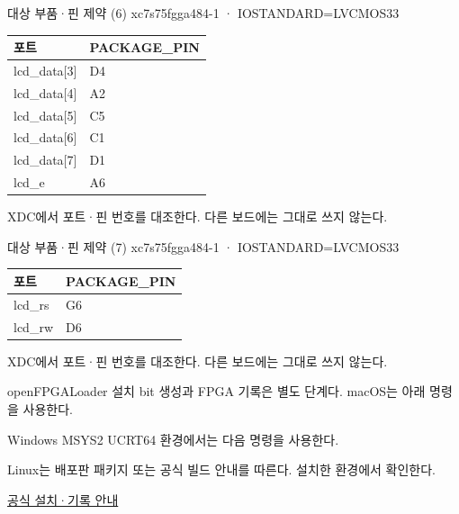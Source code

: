 \begin{frame}{대상 부품·핀 제약 (6)}\relax
\small
xc7s75fgga484-1 · IOSTANDARD=LVCMOS33\par\begin{center}\renewcommand{\arraystretch}{1.45}
\begin{tabular}{l|l}
포트 & PACKAGE\_PIN\\\hline
lcd\_data[3] & D4\\
lcd\_data[4] & A2\\
lcd\_data[5] & C5\\
lcd\_data[6] & C1\\
lcd\_data[7] & D1\\
lcd\_e & A6\\
\end{tabular}\end{center}
XDC에서 포트·핀 번호를 대조한다. 다른 보드에는 그대로 쓰지 않는다.\par
\end{frame}

\begin{frame}{대상 부품·핀 제약 (7)}\relax
\small
xc7s75fgga484-1 · IOSTANDARD=LVCMOS33\par\begin{center}\renewcommand{\arraystretch}{1.45}
\begin{tabular}{l|l}
포트 & PACKAGE\_PIN\\\hline
lcd\_rs & G6\\
lcd\_rw & D6\\
\end{tabular}\end{center}
XDC에서 포트·핀 번호를 대조한다. 다른 보드에는 그대로 쓰지 않는다.\par
\end{frame}

\begin{frame}[label=integrated-cli-post]{openFPGALoader 설치}\relax
\small
bit 생성과 FPGA 기록은 별도 단계다. macOS는 아래 명령을 사용한다.\par{}
Windows MSYS2 UCRT64 환경에서는 다음 명령을 사용한다.\par{}
Linux는 배포판 패키지 또는 공식 빌드 안내를 따른다. 설치한 환경에서 확인한다.\par{}
\href{https://trabucayre.github.io/openFPGALoader/guide/first-steps.html}{공식 설치·기록 안내}
\end{frame}

